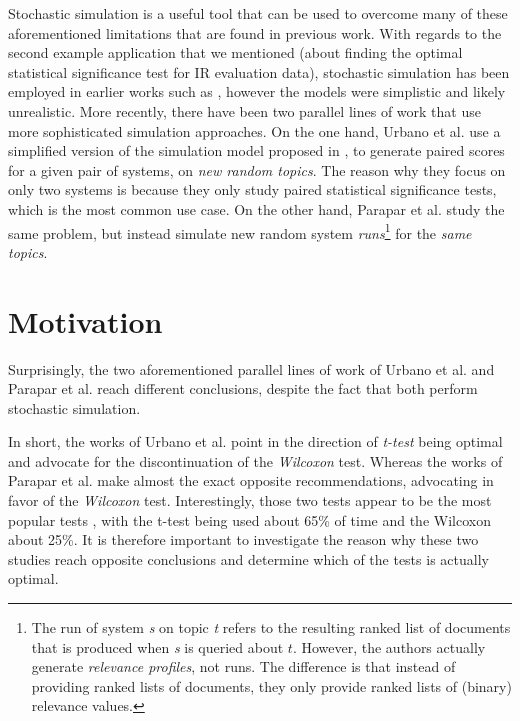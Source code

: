 Stochastic simulation is a useful tool that can be used to overcome many of these aforementioned limitations that are found in previous work. With regards to the second example application that we mentioned (about finding the optimal statistical significance test for IR evaluation data), stochastic simulation has been employed in earlier works such as \cite{Wilbur1994, Carterette2012, Carterette2015}, however the models were simplistic and likely unrealistic. More recently, there have been two parallel lines of work that use more sophisticated simulation approaches. On the one hand, Urbano et al. \cite{Urbano2019} use a simplified version of the simulation model proposed in \cite{Urbano2018, Urbano2016}, to generate paired scores for a given pair of systems, on \textit{new random topics}. The reason why they focus on only two systems is because they only study paired statistical significance tests, which is the most common use case. On the other hand, Parapar et al. \cite{Parapar2020, Parapar2021} study the same problem, but instead simulate new random system \textit{runs}\footnote{The run of system \textit{s} on topic \textit{t} refers to the resulting ranked list of documents that is produced when \textit{s} is queried about $t$. However, the authors actually generate \textit{relevance profiles}, not runs. The difference is that instead of providing ranked lists of documents, they only provide ranked lists of (binary) relevance values.} for the \textit{same topics}.

\section{Motivation}

Surprisingly, the two aforementioned parallel lines of work of Urbano et al. and Parapar et al. reach different conclusions, despite the fact that both perform stochastic simulation.

In short, the works of Urbano et al. point in the direction of \textit{t-test} being optimal and advocate for the discontinuation of the \textit{Wilcoxon} test. Whereas the works of Parapar et al. make almost the exact opposite recommendations, advocating in favor of the \textit{Wilcoxon} test. Interestingly, those two tests appear to be the most popular tests \cite{Carterette2017}, with the t-test being used about 65\% of time and the Wilcoxon about 25\%. It is therefore important to investigate the reason why these two studies reach opposite conclusions and determine which of the tests is actually optimal. 

